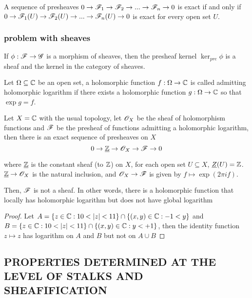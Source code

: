 \begin{proposition}
	A sequence of presheaves $0 \to \mathscr{F}_1 \to \mathscr{F}_2 \to ... \to \mathscr{F}_n \to 0$ is exact if and only if $0 \to \mathscr{F}_1(U) \to \mathscr{F}_2(U) \to ... \to \mathscr{F}_n(U) \to 0$ is exact for every open set $U$.
\end{proposition}

\subsubsection{problem with sheaves}

\begin{proposition}
	If $\phi: \mathscr{F} \to \mathscr{G}$ is a morphism of sheaves, then the presheaf kernel $\ker_{pre} \phi$ is a sheaf and the kernel in the category of sheaves.
\end{proposition}

\begin{remark}
	Let $\Omega \subseteq \mathbb{C}$ be an open set, a holomorphic function $f: \Omega \to \mathbb{C}$ is called admitting holomorphic logarithm if there exists a holomorphic function $g: \Omega \to \mathbb{C}$ so that $\exp g = f$.
	
	Let $X = \mathbb{C}$ with the usual topology, let $\mathscr{O}_X$ be the sheaf of holomorphism functions and $\mathscr{F}$ be the presheaf of functions admitting a holomorphic logarithm, then there is an exact sequence of presheaves on $X$
	$$
		0 \to \underline{\mathbb{Z}} \to \mathscr{O}_X \to \mathscr{F} \to 0
	$$
	
	where $\underline{\mathbb{Z}}$ is the constant sheaf (to $\mathbb{Z}$) on $X$, for each open set $U \subseteq X$, $\underline{Z}(U) = \mathbb{Z}$. $\underline{\mathbb{Z}} \to \mathscr{O}_X$ is the natural inclusion, and $\mathscr{O}_X \to \mathscr{F}$ is given by $f \mapsto \exp(2 \pi i f)$.
	
	Then, $\mathscr{F}$ is not a sheaf. In other words, there is a holomorphic function that locally has holomorphic logarithm but does not have global logarithm
\end{remark}

\begin{proof}
	Let $A = \{z \in \mathbb{C}: 10 < |z| < 11\} \cap \{(x, y) \in \mathbb{C}: -1 < y\}$ and $B = \{z \in \mathbb{C}: 10 < |z| < 11\} \cap \{(x, y) \in \mathbb{C}: y < +1\}$, then the identity function $z \mapsto z$ has logarithm on $A$ and $B$ but not on $A \cup B$
\end{proof}

\subsection{PROPERTIES DETERMINED AT THE LEVEL OF STALKS AND SHEAFIFICATION}

